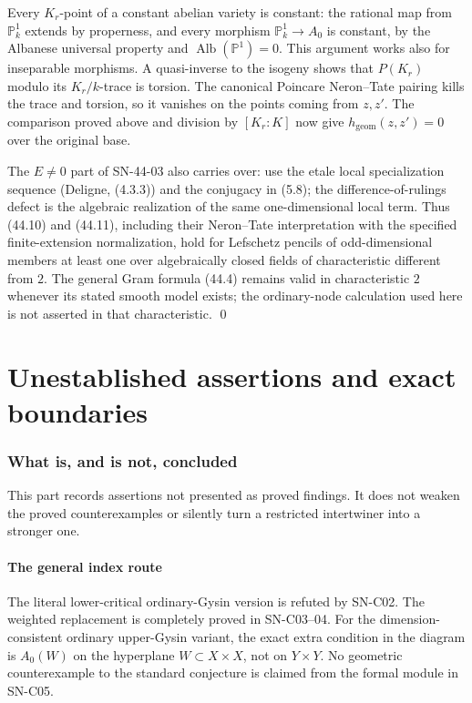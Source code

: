 \documentclass[11pt,a4paper]{article}
\theoremstyle{definition}
\theoremstyle{remark}
\begin{document}
Every $K_r$-point of a constant abelian variety is constant:
the rational map from $\mathbb P^1_k$ extends by properness,
and every morphism $\mathbb P^1_k\to A_0$ is constant, by the
Albanese universal property and
$\operatorname{Alb}(\mathbb P^1)=0$.  This argument works also
for inseparable morphisms.  A quasi-inverse to the isogeny shows
that $P(K_r)$ modulo its $K_r/k$-trace is torsion.  The canonical
Poincare Neron--Tate pairing kills the trace and torsion, so it
vanishes on the points coming from $z,z'$.  The comparison proved
above and division by $[K_r:K]$ now give
$h_{\mathrm{geom}}(z,z')=0$ over the original base.

The $E\ne0$ part of SN-44-03 also carries over: use the etale
local specialization sequence (Deligne, (4.3.3)) and the
conjugacy in (5.8); the difference-of-rulings defect is the
algebraic realization of the same one-dimensional local term.
Thus (44.10) and (44.11), including their Neron--Tate
interpretation with the specified finite-extension normalization,
hold for Lefschetz pencils of odd-dimensional members at least
one over algebraically closed fields of characteristic
different from $2$.  The general Gram formula (44.4) remains
valid in characteristic $2$ whenever its stated smooth model
exists; the ordinary-node calculation used here is not asserted
in that characteristic. \qed


\part{Unestablished assertions and exact boundaries}
\section{What is, and is not, concluded}

This part records assertions not presented as proved findings. It does
not weaken the proved counterexamples or silently turn a restricted
intertwiner into a stronger one.

\subsection{The general index route}
The literal lower-critical ordinary-Gysin version is refuted by
SN-C02. The weighted replacement is completely proved in SN-C03--04.
For the dimension-consistent ordinary upper-Gysin variant, the exact
extra condition in the diagram is $A_0(W)$ on the hyperplane
$W\subset X\times X$, not on $Y\times Y$. No geometric
counterexample to the standard conjecture is claimed from the
formal module in SN-C05.
\end{document}
